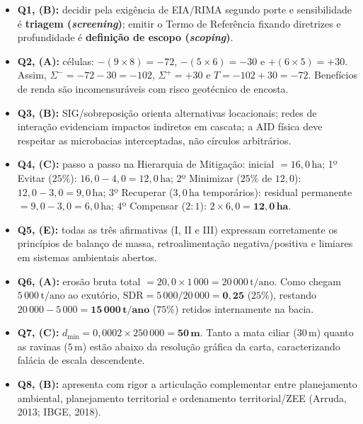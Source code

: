 \begin{boxGabarito}
  \begin{itemize}[leftmargin=1.5em, itemsep=3.5pt]
    \item \textbf{Q1, (B):} decidir pela exigência de EIA/RIMA segundo porte e sensibilidade é \textbf{triagem (\textit{screening})}; emitir o Termo de Referência fixando diretrizes e profundidade é \textbf{definição de escopo (\textit{scoping})}.
    \item \textbf{Q2, (A):} células: $-(9 \times 8) = -72$, $-(5 \times 6) = -30$ e $+(6 \times 5) = +30$. Assim, $\Sigma^{-} = -72 - 30 = -102$, $\Sigma^{+} = +30$ e $T = -102 + 30 = -72$. Benefícios de renda são incomensuráveis com risco geotécnico de encosta.
    \item \textbf{Q3, (B):} SIG/sobreposição orienta alternativas locacionais; redes de interação evidenciam impactos indiretos em cascata; a AID física deve respeitar as microbacias interceptadas, não círculos arbitrários.
    \item \textbf{Q4, (C):} passo a passo na Hierarquia de Mitigação: inicial $= 16{,}0\,\text{ha}$; 1º Evitar ($25\%$): $16{,}0 - 4{,}0 = 12{,}0\,\text{ha}$; 2º Minimizar ($25\%$ de $12{,}0$): $12{,}0 - 3{,}0 = 9{,}0\,\text{ha}$; 3º Recuperar ($3{,}0\,\text{ha}$ temporários): residual permanente $= 9{,}0 - 3{,}0 = 6{,}0\,\text{ha}$; 4º Compensar ($2:1$): $2 \times 6{,}0 = \mathbf{12{,}0\,\text{ha}}$.
    \item \textbf{Q5, (E):} todas as três afirmativas (I, II e III) expressam corretamente os princípios de balanço de massa, retroalimentação negativa/positiva e limiares em sistemas ambientais abertos.
    \item \textbf{Q6, (A):} erosão bruta total $= 20{,}0 \times 1\,000 = 20\,000\,\text{t/ano}$. Como chegam $5\,000\,\text{t/ano}$ ao exutório, $\text{SDR} = 5\,000 / 20\,000 = \mathbf{0{,}25}$ ($25\%$), restando $20\,000 - 5\,000 = \mathbf{15\,000\,\text{t/ano}}$ ($75\%$) retidos internamente na bacia.
    \item \textbf{Q7, (C):} $d_{\min} = 0{,}0002 \times 250\,000 = \mathbf{50\,\text{m}}$. Tanto a mata ciliar ($30\,\text{m}$) quanto as ravinas ($5\,\text{m}$) estão abaixo da resolução gráfica da carta, caracterizando falácia de escala descendente.
    \item \textbf{Q8, (B):} apresenta com rigor a articulação complementar entre planejamento ambiental, planejamento territorial e ordenamento territorial/ZEE (Arruda, 2013; IBGE, 2018).
  \end{itemize}
\end{boxGabarito}

